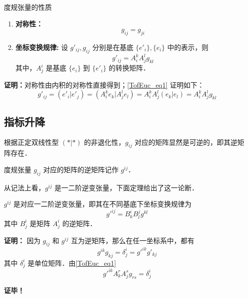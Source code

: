 \begin{theorem}{度规张量的性质}
\begin{enumerate}
\item \textbf{对称性：}\begin{equation}
g_{ij}=g_{ji}
\end{equation}
\item \textbf{坐标变换规律:} 设 $g'_{ij},g_{ij}$ 分别是在基底 $\{e'_i\},\{e_i\}$ 中的表示，则
\begin{equation}\label{TofEuc_eq1}
g'_{ij}=A^k_{i} A^l_{j}g_{kl}
\end{equation}
其中，$A^i_j$ 是基底 $\{e_i\}$ 到 $\{e'_i\}$ 的转换矩阵．
\end{enumerate}
\end{theorem}
\textbf{证明：}对称性由内积的对称性直接得到；\autoref{TofEuc_eq1} 证明如下：
\begin{equation}
g'_{ij}=(e'_i|e'_j)=(A^k_i e_k|A^l_j e_l)=A^k_{i} A^l_{j}(e_k|e_l)=A^k_{i} A^l_{j}g_{kl}
\end{equation}

\subsection{指标升降}
根据正定双线性型 $(*|*)$ 的非退化性，$g_{ij}$ 对应的矩阵显然是可逆的，即其逆矩阵存在．
\begin{definition}{}
度规张量 $g_{ij}$ 对应的矩阵的逆矩阵记作 $g^{ij}$．
\end{definition}
从记法上看，$g^{ij}$ 是一二阶逆变张量，下面定理给出了这一论断．
\begin{theorem}{}
$g^{ij}$ 是对应一二阶逆变张量，即其在不同基底下坐标变换规律为
\begin{equation}
g'^{ij}=B^i_kB^j_l g^{kl}
\end{equation}
其中 $B^i_j$ 是矩阵 $A^i_j$ 的逆矩阵．
\end{theorem} 

\textbf{证明：}
因为 $g_{ij}$ 和 $g^{ij}$ 互为逆矩阵，那么在任一坐标系中，都有 \begin{equation}
g^{ik}g_{kj}=\delta^i_j=g'^{ik}g'_{kj}
\end{equation}
其中 $\delta^i_j$ 是单位矩阵．由\autoref{TofEuc_eq1} 
\begin{equation}
g'^{ik}A^r_k A^s_j g_{rs}=\delta^i_j
\end{equation}


\textbf{证毕！}
